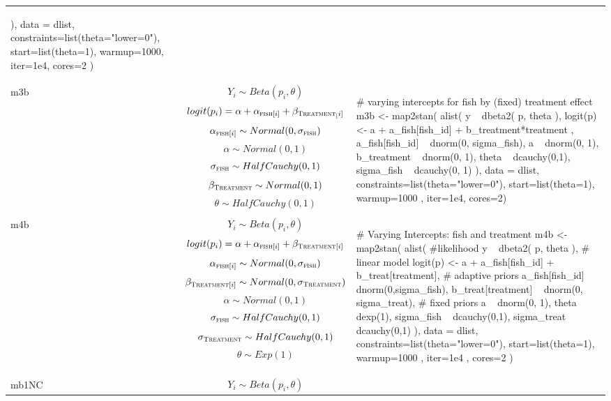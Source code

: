 \begin{longtable}{p{} |p{} |p{} }
{\begin{mylist}
  ),
  data = dlist,
  constraints=list(theta="lower=0"),
  start=list(theta=1), warmup=1000, iter=1e4, cores=2 )
  \end{mylist}}
\\ %
m3b & %
$$ Y_i \sim Beta(p_i, \theta) $$
$$ logit(p_i) = \alpha + \alpha_{\textsc{fish}[i]} + \beta_{\textsc{Treatment}_[i]} $$
$$ \alpha_{\textsc{fish}[i]} \sim Normal(0,\sigma_{\textsc{fish}}) $$
$$ \alpha \sim Normal(0, 1) $$
$$ \sigma_{\textsc{fish}} \sim HalfCauchy(0,1) $$
$$ \beta_{\textsc{Treatment}}  \sim Normal(0,1) $$
$$ \theta \sim HalfCauchy(0, 1) $$
&
{\begin{mylist}
# varying intercepts for fish by (fixed) treatment effect
m3b <- map2stan(
  alist(
    y ~ dbeta2( p, theta ),
    logit(p) <- a + a_fish[fish_id] + 
    b_treatment*treatment ,
    a_fish[fish_id] ~ dnorm(0, sigma_fish),
    a ~ dnorm(0, 1),
    b_treatment ~ dnorm(0, 1),
    theta ~ dcauchy(0,1),
    sigma_fish ~ dcauchy(0, 1)
  ),
  data = dlist,
  constraints=list(theta="lower=0"),
  start=list(theta=1), warmup=1000 , iter=1e4, cores=2) 
  \end{mylist}}
\\ %
m4b & %
$$ Y_i \sim Beta(p_i, \theta) $$
$$ logit(p_i) = \alpha + \alpha_{\textsc{fish}[i]} + \beta_{\textsc{Treatment}[i]} $$
$$ \alpha_{\textsc{fish}[i]} \sim Normal(0,\sigma_{\textsc{fish}}) $$
$$ \beta_{\textsc{Treatment}[i]} \sim Normal(0,\sigma_{\textsc{Treatment}}) $$
$$ \alpha \sim Normal(0, 1) $$
$$ \sigma_{\textsc{fish}} \sim HalfCauchy(0,1) $$
$$ \sigma_{\textsc{Treatment}} \sim HalfCauchy(0,1) $$
$$ \theta \sim Exp(1) $$
&
{\begin{mylist}
# Varying Intercepts: fish and treatment
m4b <- map2stan(
  alist(
    #likelihood
    y ~ dbeta2( p, theta ),
    # linear model
    logit(p) <- a + a_fish[fish_id] + b_treat[treatment],
    # adaptive priors
    a_fish[fish_id] ~ dnorm(0,sigma_fish),
    b_treat[treatment] ~ dnorm(0, sigma_treat),
    # fixed priors
    a ~ dnorm(0, 1),
    theta ~ dexp(1),
    sigma_fish ~ dcauchy(0,1),
    sigma_treat ~ dcauchy(0,1)
  ),
  data = dlist,
  constraints=list(theta="lower=0"),
  start=list(theta=1), warmup=1000 , iter=1e4 , cores=2 )
  \end{mylist}} 
\\ %
mb1NC & %
$$ Y_i \sim Beta(p_i, \theta) $$

\end{longtable}

